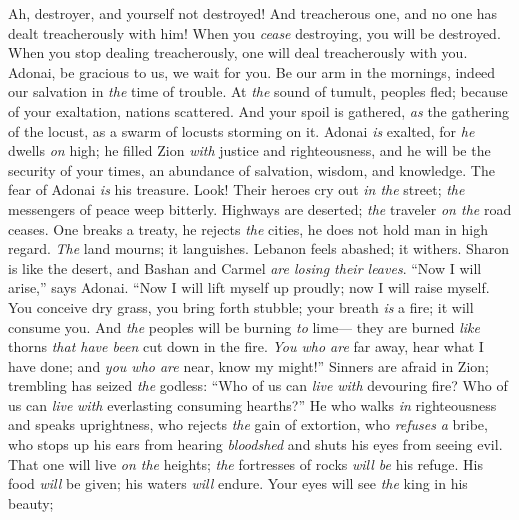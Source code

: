 \begin{biblechapter} %
 Ah, destroyer, and yourself not destroyed! 
And treacherous one, and no one has dealt treacherously with him! 
When you \textit{cease} destroying, you will be destroyed. 
When you stop dealing treacherously, one will deal treacherously with you.
\verse Adonai, be gracious to us, we wait for you. 
Be our arm in the mornings, 
indeed our salvation in \textit{the} time of trouble.
\verse At \textit{the} sound of tumult, peoples fled; 
because of your exaltation, nations scattered.
\verse And your spoil is gathered, 
\textit{as} the gathering of the locust, 
as a swarm of locusts storming on it.
\verse Adonai \textit{is} exalted, for \textit{he} dwells \textit{on} high; 
he filled Zion \textit{with} justice and righteousness,
\verse and he will be the security of your times, 
an abundance of salvation, wisdom, and knowledge. The fear of Adonai \textit{is} his treasure.
\verse Look! Their heroes cry out \textit{in the} street; 
\textit{the} messengers of peace weep bitterly.
\verse Highways are deserted; 
\textit{the} traveler \textit{on the} road ceases. 
One breaks a treaty, 
he rejects \textit{the} cities, 
he does not hold man in high regard.
\verse \textit{The} land mourns; it languishes. 
Lebanon feels abashed; it withers. 
Sharon is like the desert, 
and Bashan and Carmel \textit{are losing their leaves}.
\verse “Now I will arise,” says Adonai. 
“Now I will lift myself up proudly; 
now I will raise myself.
\verse You conceive dry grass, you bring forth stubble; 
your breath \textit{is} a fire; it will consume you.
\verse And \textit{the} peoples will be burning \textit{to} lime— 
they are burned \textit{like} thorns \textit{that have been} cut down in the fire.
\verse \textit{You who are} far away, hear what I have done; 
and \textit{you who are} near, know my might!”
\verse Sinners are afraid in Zion; 
trembling has seized \textit{the} godless: 
“Who of us can \textit{live} \textit{with} devouring fire? 
Who of us can \textit{live} \textit{with} everlasting consuming hearths?”
\verse He who walks \textit{in} righteousness 
and speaks uprightness, 
who rejects \textit{the} gain of extortion, 
who \textit{refuses} \textit{a} bribe, 
who stops up his ears from hearing \textit{bloodshed} 
and shuts his eyes from seeing evil.
\verse That one will live \textit{on the} heights; 
\textit{the} fortresses of rocks \textit{will be} his refuge. 
His food \textit{will} be given; 
his waters \textit{will} endure.
\verse Your eyes will see \textit{the} king in his beauty; 

\end{biblechapter}
